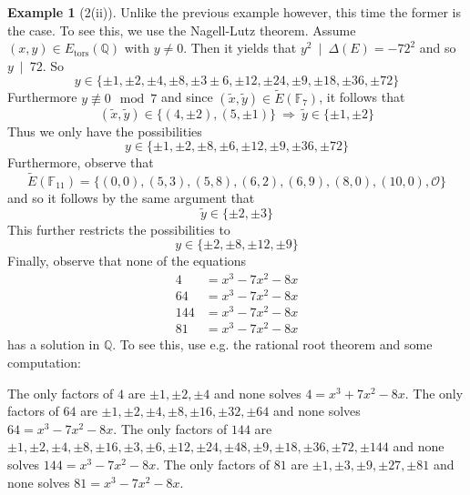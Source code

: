 \documentclass{scrartcl}
\newcommand{\F}{\mathbb{F}}
\newcommand{\Q}{\mathbb{Q}}
\renewcommand{\O}{\mathcal{O}}
\newcommand{\divides}{\ \mid \ }
\theoremstyle{definition}
\newtheorem{example}[prop]{Example}
\begin{document}
\begin{example}[2(ii)]
    Unlike the previous example however, this time the former is the case.
    To see this, we use the Nagell-Lutz theorem.
    Assume $(x, y) \in E_{\mathrm{tors}}(\Q)$ with $y \neq 0$.
    Then it yields that $y^2 \divides \Delta(E) = -72^2$ and so $y \divides 72$.
    So
    \begin{equation*}
        y \in \{ \pm 1, \pm 2, \pm 4, \pm 8, \pm 3 \pm 6, \pm 12, \pm 24, \pm 9, \pm 18, \pm 36, \pm 72 \}
    \end{equation*}
    Furthermore $y \not\equiv 0 \mod 7$ and since $(\tilde{x}, \tilde{y}) \in \tilde{E}(\F_7)$, it follows that
    \begin{equation*}
        (\tilde{x}, \tilde{y}) \in \{ (4, \pm 2), (5, \pm 1) \} \ \Rightarrow \ \tilde{y} \in \{ \pm 1, \pm 2 \}
    \end{equation*}
    Thus we only have the possibilities
    \begin{equation*}
        y \in \{ \pm 1, \pm 2, \pm 8, \pm 6, \pm 12, \pm 9, \pm 36, \pm 72 \}
    \end{equation*}
    Furthermore, observe that
    \begin{equation*}
        \tilde{E}(\F_{11}) = \{ (0, 0), (5, 3), (5, 8), (6, 2), (6, 9), (8, 0), (10, 0), \O \}
    \end{equation*}
    and so it follows by the same argument that
    \begin{equation*}
        \tilde{y} \in \{ \pm 2, \pm 3 \}
    \end{equation*}
    This further restricts the possibilities to
    \begin{equation*}
        y \in \{ \pm 2, \pm 8, \pm 12, \pm 9 \}
    \end{equation*}
    Finally, observe that none of the equations
    \begin{align*}
        4 &= x^3 - 7x^2 - 8x \\
        64 &= x^3 - 7x^2 - 8x \\
        144 &= x^3 - 7x^2 - 8x \\
        81 &= x^3 - 7x^2 - 8x
    \end{align*}
    has a solution in $\Q$.
    To see this, use e.g. the rational root theorem and some computation:

    The only factors of $4$ are $\pm 1, \pm 2, \pm 4$ and none solves $4 = x^3 + 7x^2 - 8x$.
    The only factors of $64$ are $\pm 1, \pm 2, \pm 4, \pm 8, \pm 16, \pm 32, \pm 64$ and none solves $64 = x^3 - 7x^2 - 8x$.
    The only factors of $144$ are $\pm 1, \pm 2, \pm 4, \pm 8, \pm 16, \pm 3, \pm 6, \pm 12, \pm 24, \pm 48, \pm 9, \pm 18, \pm 36, \pm 72, \pm 144$ and none solves $144 = x^3 - 7x^2 - 8x$.
    The only factors of $81$ are $\pm 1, \pm 3, \pm 9, \pm 27, \pm 81$ and none solves $81 = x^3 - 7x^2 - 8x$.


\end{example}
\end{document}
